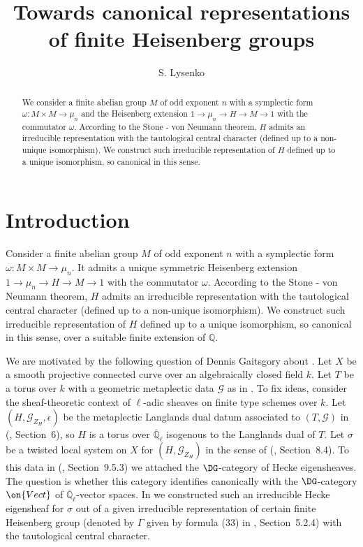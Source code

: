 \documentclass[11pt]{amsart}
\theoremstyle{definition}
\theoremstyle{remark}
\newcommand{\cG}{{\mathcal G}}
\newcommand{\QQ}{{\mathbb Q}}
\newcommand{\Qlb}{\mathbb{\bar Q}_\ell}
\newcommand{\<}{\langle}
\renewcommand{\>}{\rangle}
\newcommand{\Vect}{\on{Vect}}
\begin{document}
\title{Towards canonical representations of finite Heisenberg groups}
\author{S. Lysenko}
\address{Institut \'Elie Cartan Nancy (Math\'ematiques), Universit\'e de Lorraine, B.P. 239, F-54506 Vandoeuvre-l\`es-Nancy Cedex, France}
\begin{abstract} 
We consider a finite abelian group $M$ of odd exponent $n$ with a symplectic form $\omega: M\times M\to \mu_n$ and the Heisenberg extension $1\to \mu_n\to H\to M\to 1$ with the commutator $\omega$. 
According to the Stone - von Neumann theorem, $H$ admits an irreducible representation with the tautological central character (defined up to a non-unique isomorphism). We construct such irreducible representation of $H$ defined up to a unique isomorphism, so canonical in this sense.
\end{abstract}
\maketitle 
\section{Introduction} 

\sssec{} 
\label{Sect_1.0.1}
Consider a finite abelian group $M$ of odd exponent $n$ with a symplectic form $\omega: M\times M\to \mu_n$. It admits a unique symmetric Heisenberg extension $1\to \mu_n\to H\to M\to 1$ with the commutator $\omega$. According to the Stone - von Neumann theorem, $H$ admits an irreducible representation with the tautological central character (defined up to a non-unique isomorphism). We construct such irreducible representation of $H$ defined up to a unique isomorphism, so canonical in this sense, over a suitable finite extension of $\QQ$.

\sssec{} We are motivated by the following question of Dennis Gaitsgory about \cite{L}. Let $X$ be a smooth projective connected curve over an algebraically closed field $k$. Let $T$ be a torus over $k$ with a geometric metaplectic data $\cG$ as in \cite{GL}. To fix ideas, consider the sheaf-theoretic context of $\ell$-adic sheaves on finite type schemes over $k$. Let $(H, \cG_{Z_H},\epsilon)$ be the metaplectic Langlands dual datum associated to $(T,\cG)$ in (\cite{GL}, Section~6), so $H$ is a torus over $\Qlb$ isogenous to the Langlands dual of $T$. Let $\sigma$ be a twisted local system on $X$ for $(H, \cG_{Z_H})$ in the sense of (\cite{GL}, Section~8.4). To this data in (\cite{GL}, Section~9.5.3) we attached the $\DG$-category of Hecke eigensheaves. The question is whether this category identifies canonically with the $\DG$-category $\Vect$ of $\Qlb$-vector spaces. 
In \cite{L} we constructed such an irreducible Hecke eigensheaf for $\sigma$ out of a given irreducible representation of certain finite Heisenberg group (denoted by $\Gamma$ given by formula (33) in \cite{L}, Section~5.2.4) with the tautological central character.
\end{document}

